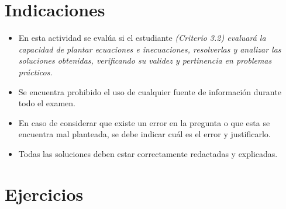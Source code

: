 \documentclass[11pt,respuestas,a4]{aleph-examen}
\begin{document}
\encabezado

\section*{Indicaciones}
\begin{itemize}[leftmargin=*]
\item 
    En esta actividad se evalúa si el estudiante \textit{(Criterio 3.2) evaluará la capacidad de plantar ecuaciones e inecuaciones, resolverlas y analizar las soluciones obtenidas, verificando su validez y pertinencia en problemas prácticos.} 
\item
    Se encuentra prohibido el uso de cualquier fuente de información durante todo el examen.
\item
    En caso de considerar que existe un error en la pregunta o que esta se encuentra mal planteada, se debe indicar cuál es el error y justificarlo.
\item
    Todas las soluciones deben estar correctamente redactadas y explicadas.
\end{itemize}

\section*{Ejercicios}
\end{document}
